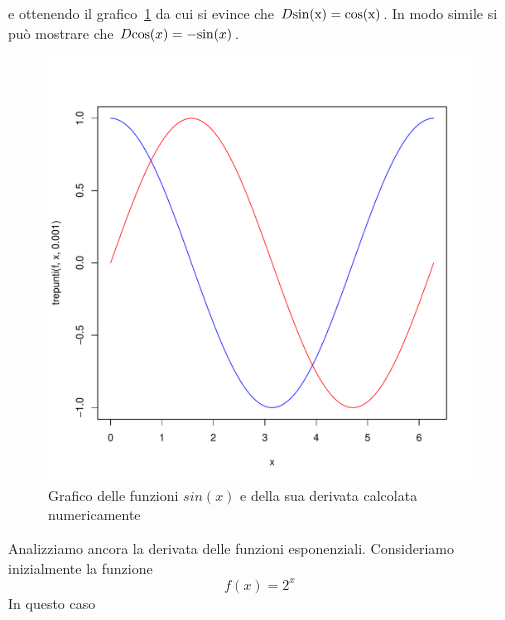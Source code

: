 \documentclass[onecolumn,11pt]{book}\usepackage[]{graphicx}\usepackage[]{color}
\makeatletter
\def\maxwidth{ %
  \ifdim\Gin@nat@width>\linewidth
    \linewidth
  \else
    \Gin@nat@width
  \fi
}
\newenvironment{knitrout}{}{} %
\makeatother
\begin{document}
e ottenendo il grafico~\ref{sincos} da cui si evince che  $D\rm{sin}(x)={\rm cos}(x)$. In modo simile si pu\`o mostrare che
$D{\rm cos}(x)=-{\rm sin}(x)$.
\begin{figure}[ htbp]
\begin{center}
\begin{knitrout}
\color{fgcolor}
\includegraphics[width=\maxwidth]{figure/unnamed-chunk-119-1} 

\end{knitrout}
\caption{Grafico delle funzioni $sin(x)$ e della sua derivata calcolata numericamente}
\label{sincos}
\end{center}
\end{figure}
Analizziamo ancora la derivata delle funzioni esponenziali. Consideriamo inizialmente
la funzione
$$f(x)=2^x$$
In questo caso
\end{document}
